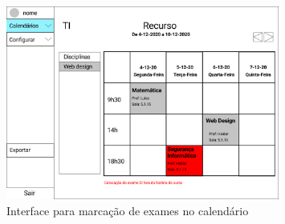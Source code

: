 \documentclass[11pt, twoside]{report}
\begin{document}
	\begin{figure}[H] 
		\centering 
		\includegraphics[width=0.8\textwidth,height=0.8\textheight,keepaspectratio]{image/prototipowireframes/calendarioaviso}
		\caption{Interface para marcação de exames no calendário}
		\label{interfacemarcarexame}
	\end{figure}
\end{document}
